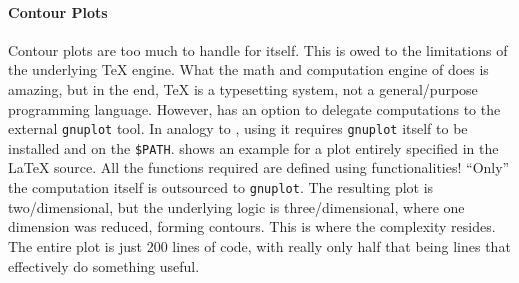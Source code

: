\paragraph{Contour Plots}
Contour plots are too much to handle for  itself.
This is owed to the limitations of the underlying \TeX{} engine.
What the math and computation engine of  does is amazing,
but in the end, \TeX{} is a typesetting system, not a general\-/purpose programming
language.
However,  has an option to delegate computations to the
external \texttt{gnuplot} tool.
In analogy to , using it requires \texttt{gnuplot} itself to be
installed and on the \verb|$PATH|.
 shows an example for a plot entirely specified in the
\LaTeX{} source.
All the functions required are defined using  functionalities!
\enquote{Only} the computation itself is outsourced to \texttt{gnuplot}.
The resulting plot is two\-/dimensional, but the underlying logic is
three\-/dimensional, where one dimension was reduced, forming contours.
This is where the complexity resides.
The entire plot is just 200 lines of code, with really only half that being
lines that effectively do something useful.


